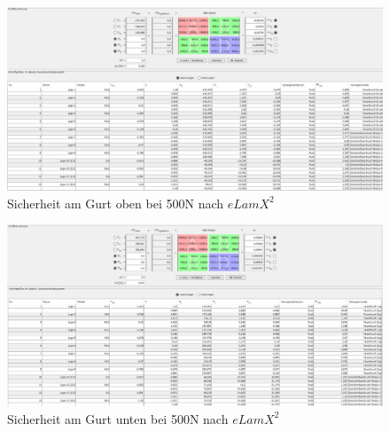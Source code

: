 \begin{figure}[h]
	\centering
	\includegraphics[width=1\textwidth]{Bilder/sicher3}
	\caption{Sicherheit am Gurt oben bei 500N nach $eLamX^{2}$}
\end{figure}
\begin{figure}[h]
	\centering
	\includegraphics[width=1\textwidth]{Bilder/sicher4}
	\caption{Sicherheit am Gurt unten bei 500N nach $eLamX^{2}$}
	\label{sicher-gurt}
\end{figure}
\FloatBarrier
\newpage
